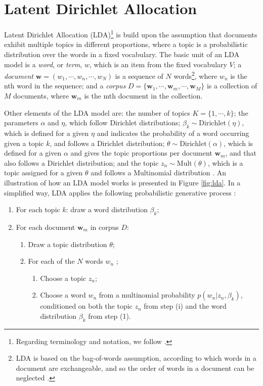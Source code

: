 \section{Latent Dirichlet Allocation} \label{LDA}

Latent Dirichlet Allocation (LDA)\footnote{Regarding terminology and notation, we follow \cite{blei_latent_2003}.} is build upon the assumption that documents exhibit multiple topics in different proportions, where a topic is a probabilistic distribution over the words in a fixed vocabulary. The basic unit of an LDA model is a \textit{word}, or \textit{term}, $w$, which is an item from the fixed vocabulary $V$; a \textit{document} $\mathbf{w} = (w_{1}, \cdots, w_{n}, \cdots, w_{N})$ is a sequence of $N$ words\footnote{LDA is based on the bag-of-words assumption, according to which words in a document are exchangeable, and so the order of words in a document can be neglected \citep{blei_latent_2003}.}, where $w_{n}$ is the nth word in the sequence; and a \textit{corpus} $D = \{ \mathbf{w}_{1}, \cdots, \mathbf{w}_{m}, \cdots, \mathbf{w}_{M} \}$ is a collection of $M$ documents, where $\mathbf{w}_{m}$ is the mth document in the collection. 

Other elements of the LDA model are: the number of topics $K = \{ 1, \cdots, k \}$; the parameters $\alpha$ and $\eta$, which follow Dirichlet distributions; $\beta_{k} \sim \text{Dirichlet}(\eta)$, which is defined for a given $\eta$ and indicates the probability of a word occurring given a topic $k$, and follows a Dirichlet distribution; $\theta \sim \text{Dirichlet}(\alpha)$, which is defined for a given $\alpha$ and gives the topic proportions per document $\mathbf{w}_{m}$, and that also follows a Dirichlet distribution; and the topic $z_{n} \sim \text{Mult}(\theta)$, which is a topic assigned for a given $\theta$ and follows a Multinomial distribution \citep{blei_latent_2003, blei_topic_2009, grun_topicmodels_2011}. An illustration of how an LDA model works is presented in Figure \ref{fig:lda}. In a simplified way, LDA applies the following probabilistic generative process \citep{blei_topic_2009, grun_topicmodels_2011, ponweiser_latent_2012}:

\begin{enumerate}
\item For each topic $k$: draw a word distribution $\beta_{k}$;
\item For each document $\mathbf{w}_{m}$ in corpus $D$:
\begin{enumerate}
	\item Draw a topic distribution $\theta$;
	\item For each of the $N$ words $w_{n}$	;
	\begin{enumerate}
		\item Choose a topic $z_{n}$;
		\item Choose a word $w_{n}$ from a multinomial probability $p(w_{n} | z_{n}, \beta_{k})$, conditioned on both the topic $z_{n}$ from step (i) and the word distribution $\beta_{k}$ from step (1).
	\end{enumerate}
\end{enumerate}
\end{enumerate} 

